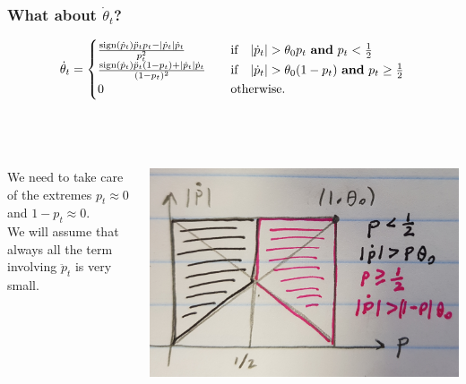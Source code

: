 \documentclass[aspectratio=169]{beamer}\usepackage[utf8]{inputenc}
\DeclareMathOperator{\sign}{sign}
\begin{document}
\begin{frame}\frametitle{What about $\dot{\theta}_t$?}

\begin{equation*}
\dot{\theta}_t=\begin{cases}
\frac{\sign(\dot{p}_t)\ddot{p}_tp_t-|\dot{p}_t|\dot{p}_t}{p_t^2}\quad&\text{if}\quad|\dot{p}_t|>\theta_0p_t\ \text{\textbf{and}}\ p_t<\frac{1}{2}\\
\frac{\sign(\dot{p}_t)\ddot{p}_t(1-p_t)+|\dot{p}_t|\dot{p}_t}{(1-p_t)^2}\quad&\text{if}\quad|\dot{p}_t|>\theta_0(1-p_t)\ \text{\textbf{and}}\ p_t\geq\frac{1}{2}\\
0\quad&\text{otherwise}.
\end{cases}
\end{equation*}
\quad\\
\quad\\

\begin{columns}[c]

We need to take care of the extremes $p_t\approx0$ and $1-p_t\approx0$.\\
We will assume that always all the term involving $\ddot{p}_t$ is very small.

\includegraphics[width=0.9\columnwidth]{20200225_150346.jpg}

\end{columns}

\end{frame}
\end{document}
